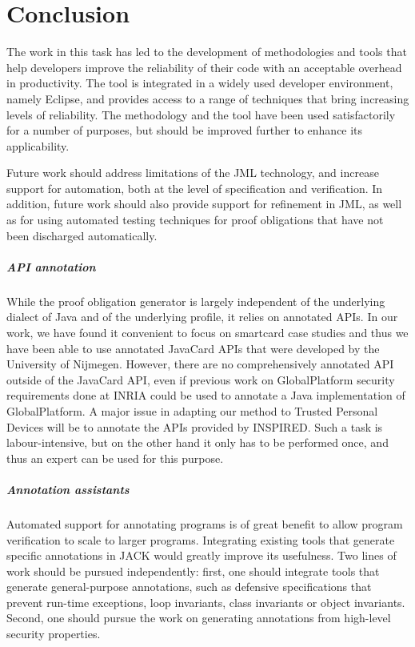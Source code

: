 \newcommand{\compil}[2]{\overline{#1}^{#2}}

\newcommand{\compilp}[1]{{\cal C}(#1)}


\chapter{Conclusion} 

The work in this task has led to the development of methodologies and
tools that help developers improve the reliability of their code with
an acceptable overhead in productivity. The tool is integrated in a
widely used developer environment, namely Eclipse, and provides access
to a range of techniques that bring increasing levels of reliability.
The methodology and the tool have been used satisfactorily for a
number of purposes, but should be improved further to enhance its
applicability.

Future work should address limitations of the JML technology, and
increase support for automation, both at the level of specification
and verification. In addition, future work should also provide support
for refinement in JML, as well as for using automated testing
techniques for proof obligations that have not been discharged
automatically.


\paragraph{API annotation}
While the proof obligation generator is largely independent of the
underlying dialect of Java and of the underlying profile, it relies on
annotated APIs. In our work, we have found it convenient to focus on
smartcard case studies and thus we have been able to use annotated
JavaCard APIs that were developed by the University of Nijmegen.
However, there are no comprehensively annotated API outside of the
Java\-Card API, even if previous work on GlobalPlatform security
requirements done at INRIA could be used to annotate a Java
implementation of GlobalPlatform. A major issue in adapting our method
to Trusted Personal Devices will be to annotate the APIs provided by
INSPIRED. Such a task is labour-intensive, but on the other hand it
only has to be performed once, and thus an expert can be used for this
purpose.

\paragraph{Annotation assistants}
Automated support for annotating programs is of great benefit to allow
program verification to scale to larger programs. Integrating existing
tools that generate specific annotations in JACK would greatly improve
its usefulness. Two lines of work should be pursued independently:
first, one should integrate tools that generate general-purpose
annotations, such as defensive specifications that prevent run-time
exceptions, loop invariants, class invariants or object invariants.
Second, one should pursue the work on generating annotations from 
high-level security properties.


